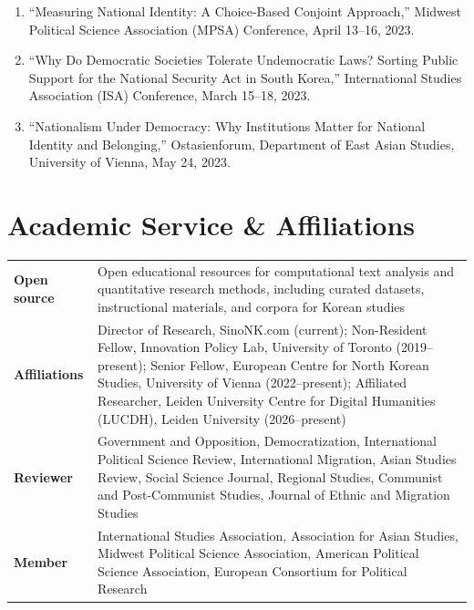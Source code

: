 \documentclass[11pt, a4paper]{article}
\begin{document}
\begin{enumerate}[itemsep=0.05em]
  \item ``Measuring National Identity: A Choice-Based Conjoint Approach,'' Midwest Political Science Association (MPSA) Conference, April 13--16, 2023.

  \item ``Why Do Democratic Societies Tolerate Undemocratic Laws? Sorting Public Support for the National Security Act in South Korea,'' International Studies Association (ISA) Conference, March 15--18, 2023.

  \item ``Nationalism Under Democracy: Why Institutions Matter for National Identity and Belonging,'' Ostasienforum, Department of East Asian Studies, University of Vienna, May 24, 2023.
\end{enumerate}

\section{Academic Service \& Affiliations}

\noindent\begin{tabularx}{\textwidth}{@{}>{\raggedright\arraybackslash}p{2.4cm}X@{}}
  \textbf{Open source} & Open educational resources for computational text analysis and quantitative research methods, including curated datasets, instructional materials, and corpora for Korean studies \\[0.3em]
  \textbf{Affiliations} & Director of Research, SinoNK.com (current); Non-Resident Fellow, Innovation Policy Lab, University of Toronto (2019--present); Senior Fellow, European Centre for North Korean Studies, University of Vienna (2022--present); Affiliated Researcher, Leiden University Centre for Digital Humanities (LUCDH), Leiden University (2026--present) \\[0.3em]
  \textbf{Reviewer} & Government and Opposition, Democratization, International Political Science Review, International Migration, Asian Studies Review, Social Science Journal, Regional Studies, Communist and Post-Communist Studies, Journal of Ethnic and Migration Studies \\[0.3em]
  \textbf{Member} & International Studies Association, Association for Asian Studies, Midwest Political Science Association, American Political Science Association, European Consortium for Political Research
\end{tabularx}

\end{document}
